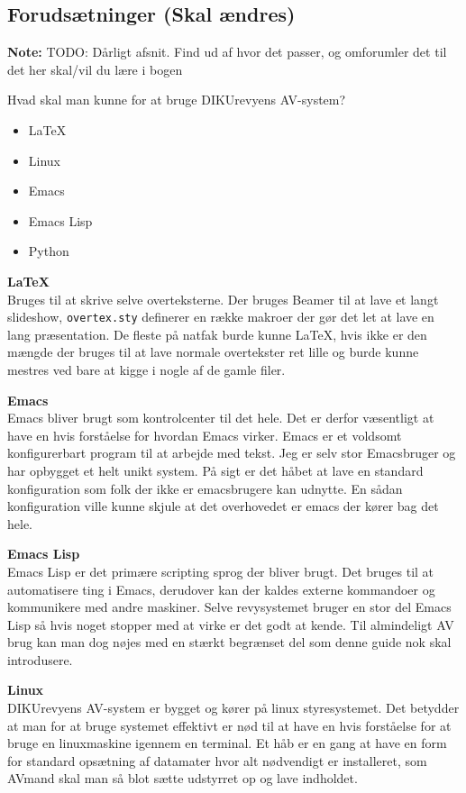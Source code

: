 \documentclass[10pt,a4paper,danish]{article}
\newcommand{\note}[1]{\begin{mdframed}[style=note]\textbf{Note:}
    #1\end{mdframed}}
\newcommand{\code}[1]{\colorbox{verbgray}{\texttt{#1}}}
\begin{document}
\subsection{Forudsætninger (Skal ændres)}
\note{TODO: Dårligt afsnit. Find ud af hvor det passer, og omforumler det til
  det her skal/vil du lære i bogen}

Hvad skal man kunne for at bruge DIKUrevyens AV-system?

\begin{itemize}
\item \LaTeX
\item Linux
\item Emacs
\item Emacs Lisp
\item Python
\end{itemize}

\textbf{\LaTeX}\\
Bruges til at skrive selve overteksterne. Der bruges Beamer til at lave et langt
slideshow, \code{overtex.sty} definerer en række makroer der gør det let at lave en
lang præsentation.
De fleste på natfak burde kunne \LaTeX, hvis ikke er den mængde der bruges til
at lave normale overtekster ret lille og burde kunne mestres ved bare at kigge i
nogle af de gamle filer.

\textbf{Emacs}\\
Emacs bliver brugt som kontrolcenter til det hele.
Det er derfor væsentligt at have en hvis forståelse for hvordan Emacs virker.
Emacs er et voldsomt konfigurerbart program til at arbejde med tekst.
Jeg er selv stor Emacsbruger og har opbygget et helt unikt system.
På sigt er det håbet at lave en standard konfiguration som folk der ikke er
emacsbrugere kan udnytte. En sådan konfiguration ville kunne skjule at det
overhovedet er emacs der kører bag det hele.

\textbf{Emacs Lisp}\\
Emacs Lisp er det primære scripting sprog der bliver brugt.
Det bruges til at automatisere ting i Emacs, derudover kan der kaldes externe
kommandoer og kommunikere med andre maskiner.
Selve revysystemet bruger en stor del Emacs Lisp så hvis noget stopper med at
virke er det godt at kende. Til almindeligt AV brug kan man dog nøjes med en
stærkt begrænset del som denne guide nok skal introdusere.

\textbf{Linux}\\
DIKUrevyens AV-system er bygget og kører på linux styresystemet.
Det betydder at man for at bruge systemet effektivt er nød til at have en hvis
forståelse for at bruge en linuxmaskine igennem en terminal.
Et håb er en gang at have en form for standard opsætning af datamater hvor alt
nødvendigt er installeret, som AVmand skal man så blot sætte udstyrret op og
lave indholdet.
\end{document}
